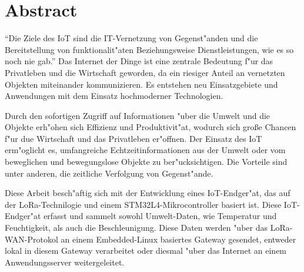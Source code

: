 
\chapter{ Abstract} \label{Abstract}	
\enquote{Die Ziele des IoT sind die IT-Vernetzung von Gegenst"anden und 
die Bereitstellung von funktionalit"aten Beziehungsweise 
Dienstleistungen, wie es so noch nie gab.} Das Internet der Dinge ist 
eine zentrale Bedeutung f"ur das Privatleben und die Wirtschaft geworden, 
da ein riesiger Anteil an vernetzten Objekten miteinander kommunizieren. 
Es entstehen neu Einsatzgebiete und Anwendungen mit dem Einsatz 
hochmoderner Technologien. 

Durch den sofortigen Zugriff auf Informationen "uber die Umwelt und die 
Objekte erh"ohen sich Effizienz und Produktivit"at, wodurch sich gro\ss{}e 
Chancen f"ur due Wirtschaft und das Privatleben er"offnen. Der Einsatz des 
IoT erm"oglicht es, umfangreiche Echtzeitinformationen aus der Umwelt 
oder  vom beweglichen und bewegungslose Objekte zu ber"ucksichtigen. Die 
Vorteile sind unter anderen, die zeitliche Verfolgung von Gegenst"ande.

Diese Arbeit besch"aftig sich mit der Entwicklung eines IoT-Endger"at, das 
auf der LoRa-Technilogie und einem STM32L4-Mikrocontroller basiert ist. 
Diese IoT-Endger"at erfasst und sammelt sowohl Umwelt-Daten, wie
Temperatur und Feuchtigkeit, als auch die Beschleunigung. Diese Daten 
werden "uber das LoRa-WAN-Protokol an einem Embedded-Linux basiertes 
Gateway gesendet, entweder lokal in diesem Gateway verarbeitet oder 
diesmal "uber das Internet an einem Anwendungsserver weitergeleitet. 


\newpage




